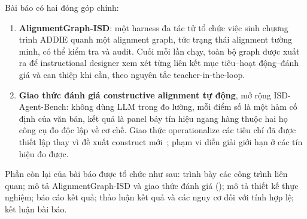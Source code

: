 Bài báo có hai đóng góp chính:
\begin{enumerate}
  \item \textbf{AlignmentGraph-ISD}: một harness đa tác tử tổ chức việc sinh
  chương trình ADDIE quanh một alignment graph, tức trạng thái alignment tường
  minh, có thể kiểm tra và audit. Cuối mỗi lần chạy, toàn bộ graph được xuất ra để
  instructional designer xem xét từng liên kết mục tiêu--hoạt động--đánh giá và
  can thiệp khi cần, theo nguyên tắc teacher-in-the-loop.
  \item \textbf{Giao thức đánh giá constructive alignment tự động}, mở rộng
  ISD-Agent-Bench: không dùng LLM trong đo lường, mỗi điểm số là một hàm cố định
  của văn bản, kết quả là panel bảy tín hiệu ngang hàng thuộc hai họ công cụ đo
  độc lập về cơ chế. Giao thức operationalize các tiêu chí đã được thiết lập thay
  vì đề xuất construct
  mới~\cite{biggs1996enhancing,porter2002measuring,webb1997criteria}; phạm vi
  diễn giải giới hạn ở các tín hiệu đo được.
\end{enumerate}

Phần còn lại của bài báo được tổ chức như sau:  trình bày
các công trình liên quan;  mô tả AlignmentGraph-ISD và giao thức
đánh giá ();  mô tả thiết kế
thực nghiệm;  báo cáo kết quả;  thảo luận
kết quả và các nguy cơ đối với tính hợp lệ;  kết luận bài
báo.
